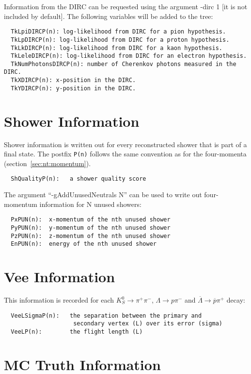 \documentclass[11pt]{article}
\begin{document}
Information from the DIRC can be requested using the argument -dirc 1 [it is not included by default]. The following variables will be added to the tree:
\begin{verbatim}
  TkLpiDIRCP(n): log-likelihood from DIRC for a pion hypothesis.
  TkLpDIRCP(n): log-likelihood from DIRC for a proton hypothesis.
  TkLkDIRCP(n): log-likelihood from DIRC for a kaon hypothesis.
  TkLeleDIRCP(n): log-likelihood from DIRC for an electron hypothesis.
  TkNumPhotonsDIRCP(n): number of Cherenkov photons measured in the DIRC.
  TkXDIRCP(n): x-position in the DIRC.
  TkYDIRCP(n): y-position in the DIRC.
\end{verbatim}

\section{Shower Information}
\label{sec:nt:shower}

Shower information is written out for every reconstructed shower that is part of a final state.  The postfix {\tt P(n)} follows the same convention as for the four-momenta (section~\ref{sec:nt:momentum}).
\begin{verbatim}
  ShQualityP(n):   a shower quality score
\end{verbatim}

The argument ``-gAddUnusedNeutrals N'' can be used to write out four-momentum information for N unused showers:
\begin{verbatim}
  PxPUN(n):  x-momentum of the nth unused shower
  PyPUN(n):  y-momentum of the nth unused shower
  PzPUN(n):  z-momentum of the nth unused shower
  EnPUN(n):  energy of the nth unused shower
\end{verbatim}


\section{Vee Information}
\label{sec:nt:vee}

This information is recorded for each $K^0_S\to\pi^+\pi^-$, $\Lambda \to p\pi^-$ and $\overline{\Lambda}\to\overline{p}\pi^+$ decay:
\begin{verbatim}
  VeeLSigmaP(n):   the separation between the primary and
                    secondary vertex (L) over its error (sigma)
  VeeLP(n):        the flight length (L)
\end{verbatim}

\section{MC Truth Information}
\label{sec:nt:truth}
\end{document}
